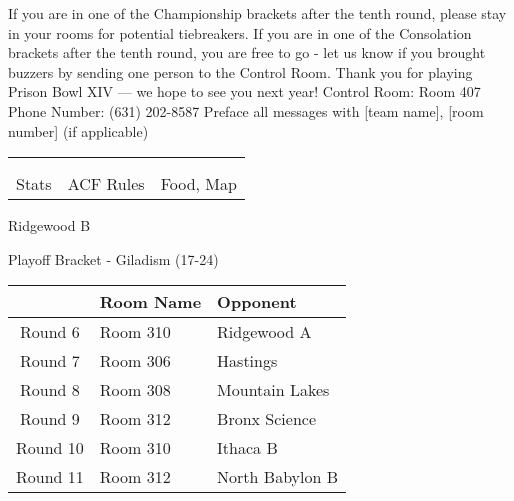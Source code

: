 \documentclass{article}%
\begin{document}
\vspace*{30pt}%
\linebreak%
If you are in one of the Championship brackets after the tenth round, please stay in your rooms for potential tiebreakers.\newline%
\newline%
If you are in one of the Consolation brackets after the tenth round, you are free to go {-} let us know if you brought buzzers by sending one person to the Control Room.\newline%
\newline%
Thank you for playing Prison Bowl XIV — we hope to see you next year!\newline%
\newline%
Control Room: Room 407\newline%
Phone Number: (631) 202{-}8587\newline%
Preface all messages with {[}team name{]}, {[}room number{]} (if applicable)%
\vspace*{30pt}%
\newline%
%
\begin{tabularx}{\textwidth}{YYY}%
  &  &  \\%
\\%
Stats&ACF Rules&Food, Map\\%
\end{tabularx}%
\newpage%
\begin{center}%
\begin{Huge}%
Ridgewood B%
\end{Huge}%
\vspace*{12pt}%
\linebreak%
\begin{Large}%
Playoff Bracket {-} Giladism (17{-}24)%
\end{Large}%
\end{center}%
\vspace*{4pt}%
%
\begin{tabularx}{\textwidth}{|c|Y|Y|}%
\hline%
&Room Name&Opponent\\%
\hline%
Round 6&Room 310&Ridgewood A\\%
Round 7&Room 306&Hastings\\%
Round 8&Room 308&Mountain Lakes\\%
Round 9&Room 312&Bronx Science\\%
Round 10&Room 310&Ithaca B\\%
Round 11&Room 312&North Babylon B\\%
\hline%
\end{tabularx}%
\end{document}

